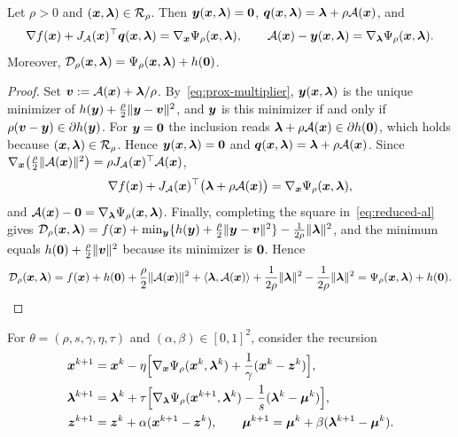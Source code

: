 \begin{proposition}
\label{prop:reduction}
Let \(\rho>0\) and \((\bm{x},\bm{\lambda})\in\mathcal R_\rho\). Then
\(\bm{y}(\bm{x},\bm{\lambda})=\bm{0}\), \(\bm{q}(\bm{x},\bm{\lambda})=\bm{\lambda}+\rho\mathcal{A}(\bm{x})\), and
\[
\nabla f(\bm{x})+J_{\mathcal{A}}(\bm{x})^\top\bm{q}(\bm{x},\bm{\lambda})=\nabla_{\bm{x}}\Psi_\rho(\bm{x},\bm{\lambda}),
\qquad
\mathcal{A}(\bm{x})-\bm{y}(\bm{x},\bm{\lambda})=\nabla_{\bm{\lambda}}\Psi_\rho(\bm{x},\bm{\lambda}).
\]
Moreover,
\(\mathcal{D}_\rho(\bm{x},\bm{\lambda})=\Psi_\rho(\bm{x},\bm{\lambda})+h(\bm{0})\).
\end{proposition}

\begin{proof}
Set \(\bm{v}:=\mathcal{A}(\bm{x})+\bm{\lambda}/\rho\). By~\eqref{eq:prox-multiplier}, \(\bm{y}(\bm{x},\bm{\lambda})\)
is the unique minimizer of \(h(\bm{y})+\frac{\rho}{2}\|\bm{y}-\bm{v}\|^2\), and
\(\bm{y}\) is this minimizer if and only if \(\rho(\bm{v}-\bm{y})\in\partial h(\bm{y})\).
For \(\bm{y}=\bm{0}\) the inclusion reads
\(\bm{\lambda}+\rho\mathcal{A}(\bm{x})\in\partial h(\bm{0})\), which holds because
\((\bm{x},\bm{\lambda})\in\mathcal R_\rho\). Hence \(\bm{y}(\bm{x},\bm{\lambda})=\bm{0}\) and
\(\bm{q}(\bm{x},\bm{\lambda})=\bm{\lambda}+\rho\mathcal{A}(\bm{x})\). Since
\(\nabla_{\bm{x}}\bigl(\frac{\rho}{2}\|\mathcal{A}(\bm{x})\|^2\bigr)=\rho J_{\mathcal{A}}(\bm{x})^\top\mathcal{A}(\bm{x})\),
\[
\nabla f(\bm{x})+J_{\mathcal{A}}(\bm{x})^\top\bigl(\bm{\lambda}+\rho\mathcal{A}(\bm{x})\bigr)
=\nabla_{\bm{x}}\Psi_\rho(\bm{x},\bm{\lambda}),
\]
and \(\mathcal{A}(\bm{x})-\bm{0}=\nabla_{\bm{\lambda}}\Psi_\rho(\bm{x},\bm{\lambda})\).
Finally, completing the square in~\eqref{eq:reduced-al} gives
\(\mathcal{D}_\rho(\bm{x},\bm{\lambda})=f(\bm{x})+\min_{\bm{y}}\{h(\bm{y})+\frac{\rho}{2}\|\bm{y}-\bm{v}\|^2\}
-\frac{1}{2\rho}\|\bm{\lambda}\|^2\), and the minimum equals
\(h(\bm{0})+\frac{\rho}{2}\|\bm{v}\|^2\) because its minimizer is \(\bm{0}\). Hence
\[
\mathcal{D}_\rho(\bm{x},\bm{\lambda})
=f(\bm{x})+h(\bm{0})+\frac{\rho}{2}\|\mathcal{A}(\bm{x})\|^2+\langle\bm{\lambda},\mathcal{A}(\bm{x})\rangle
+\frac{1}{2\rho}\|\bm{\lambda}\|^2-\frac{1}{2\rho}\|\bm{\lambda}\|^2
=\Psi_\rho(\bm{x},\bm{\lambda})+h(\bm{0}).
\]
\end{proof}

For \(\theta=(\rho,s,\gamma,\eta,\tau)\) and \((\alpha,\beta)\in[0,1]^2\), consider
the recursion
\begin{equation}\label{eq:gda-recursion}
\begin{aligned}
\bm{x}^{k+1}&=\bm{x}^k-\eta\Bigl[\nabla_{\bm{x}}\Psi_\rho(\bm{x}^k,\bm{\lambda}^k)
  +\frac{1}{\gamma}(\bm{x}^k-\bm{z}^k)\Bigr],\\
\bm{\lambda}^{k+1}&=\bm{\lambda}^k+\tau\Bigl[\nabla_{\bm{\lambda}}\Psi_\rho(\bm{x}^{k+1},\bm{\lambda}^k)
  -\frac{1}{s}(\bm{\lambda}^k-\bm{\mu}^k)\Bigr],\\
\bm{z}^{k+1}&=\bm{z}^k+\alpha(\bm{x}^{k+1}-\bm{z}^k),\qquad
\bm{\mu}^{k+1}=\bm{\mu}^k+\beta(\bm{\lambda}^{k+1}-\bm{\mu}^k).
\end{aligned}
\end{equation}

